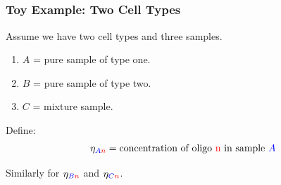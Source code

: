 \documentclass{beamer}
\begin{document}
\subsection{}

\begin{frame}
  \frametitle{}
  \begin{center}
  {\color{blue}{\Huge
      New Methodology
  }}
  \end{center}
\end{frame}


\begin{frame}
  \frametitle{Toy Example: Two Cell Types}

  Assume we have {\color{blue} two cell types} and three samples.
  \begin{enumerate}
  \item {\color{blue}$A$} = pure sample of type one.
  \item {\color{blue}$B$} = pure sample of type two.
  \item {\color{blue}$C$} = mixture sample.
  \end{enumerate}\vspace{.25cm}

Define:
{\Large  \[
\eta_{{\color{blue}A}{\color{red}n}} = \text{concentration of oligo {\color{red}n} in sample {\color{blue}$A$}}
\]}

Similarly for $\eta_{{\color{blue}B}{\color{red}n}}$ and $\eta_{{\color{blue}C}{\color{red}n}}$.
\end{frame}
\end{document}
